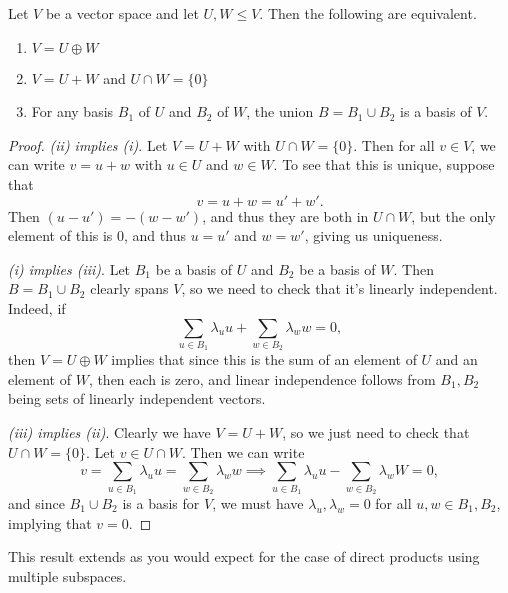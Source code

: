 \documentclass[a4paper]{scrartcl}
\begin{document}
\begin{lemma}
    Let $V$ be a vector space and let $U, W \leq V$.
    Then the following are equivalent.
    \begin{enumerate}[label=(\roman*)]
        \item $V = U \oplus W$
        \item $V = U + W$ and $U \cap W = \{0\}$
        \item For any basis $B_1$ of $U$ and $B_2$ of $W$, the union $B = B_1 \cup B_2$ is a basis of $V$.
    \end{enumerate}
\end{lemma}
\begin{proof}
    \emph{(ii) implies (i)}. Let $V = U + W$ with $U \cap W = \{0\}$. Then for all $v \in V$, we can write $v = u + w$ with $u \in U$ and $w \in W$. To see that this is unique, suppose that
    $$
    v = u + w = u' + w'.
    $$
    Then $(u - u') = - (w-w')$, and thus they are both in $U \cap W$, but the only element of this is $0$, and thus $u = u'$ and $w = w'$, giving us uniqueness.

    \emph{(i) implies (iii)}. Let $B_1$ be a basis of $U$ and $B_2$ be a basis of $W$. Then $B = B_1 \cup B_2$ clearly spans $V$, so we need to check that it's linearly independent. Indeed, if
    $$
    \sum_{u \in B_1} \lambda_u u + \sum_{w \in B_2} \lambda_w w = 0,
    $$
    then $V = U \oplus W$ implies that since this is the sum of an element of $U$ and an element of $W$, then each is zero, and linear independence follows from $B_1, B_2$ being sets of linearly independent vectors.

    \emph{(iii) implies (ii)}. 
    Clearly we have $V = U+W$, so we just need to check that $U \cap W = \{0\}$. Let $v \in U \cap W$. Then we can write
    $$
    v = \sum_{u \in B_1} \lambda_u u = \sum_{w \in B_2} \lambda_w w \implies \sum_{u \in B_1} \lambda_u u - \sum_{w \in B_2} \lambda_w W = 0,
    $$
    and since $B_1 \cup B_2$ is a basis for $V$, we must have $\lambda_u, \lambda_w = 0$ for all $u, w \in B_1, B_2$, implying that $v = 0$.
\end{proof}

This result extends as you would expect for the case of direct products using multiple subspaces.
\end{document}
